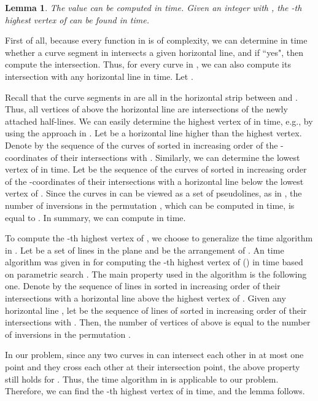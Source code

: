 \documentclass[11pt]{article}
\newenvironment{proof}{\noindent {\textbf{Proof:}}\rm}{\hfill 
\rm}
\newtheorem{Lem}{Lemma}
\begin{document}
\begin{Lem}\label{lem:new50}
The value  can be computed in  time. Given an
integer  with , the -th
highest vertex of  can be found in  time.
\end{Lem}
\begin{proof}
First of all, because every function in  is of  complexity,
we can determine in  time whether a curve segment in 
intersects a given horizontal line, and if ``yes", then compute the
intersection. Thus, for every curve in , we can also compute its
intersection with any horizontal line in  time. Let
.

Recall that the curve segments in  are all in the horizontal strip between
 and . Thus, all vertices of  above the
horizontal line  are intersections of the newly attached half-lines.
We can easily determine the highest vertex of  in
 time, e.g., by using the approach in \cite{ref:ColeAn89}. Let
 be a horizontal line higher than the highest vertex. Denote by
 the sequence of the curves of  sorted in
increasing order of the -coordinates of their intersections with
. Similarly, we can determine the lowest vertex of  in
 time. Let  be
the sequence of the curves of  sorted in increasing order of the
-coordinates of their intersections with a horizontal line below
the lowest vertex of . Since the curves in  can be
viewed as a set of pseudolines, as in \cite{ref:ColeAn89}, the
number of inversions in the permutation , which can be computed
in  time, is equal to . In summary, we can
compute  in  time.

To compute the -th highest vertex of , we choose to
generalize the  time algorithm in \cite{ref:ColeAn89}.
Let  be a set of  lines in the plane and  be the arrangement of .
An  time algorithm was given in \cite{ref:ColeAn89} for
computing the -th highest vertex of  ()
in  time based on parametric search \cite{ref:ColeSl87,ref:MegiddoAp83}. The main
property used in the algorithm \cite{ref:ColeAn89} is the following one. Denote by
 the sequence of lines in  sorted in
increasing order of their intersections with a horizontal line above
the highest vertex of . Given any horizontal line , let
 be the sequence of lines
of  sorted in increasing order of their intersections with .
Then, the number of vertices of  above  is equal to the
number of inversions in the permutation .

In our problem, since
any two curves in  can intersect each other in at most one point and they
cross each other at their intersection point, the above property still holds for
. Thus, the  time algorithm in
\cite{ref:ColeAn89} is applicable to our problem. Therefore, we can
find the -th highest vertex of  in  time, and
the lemma follows.
\end{proof}
\end{document}
